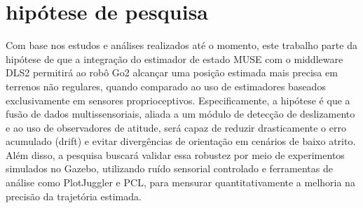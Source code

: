 \chapter{hipótese de pesquisa}
Com base nos estudos e análises realizados até o momento, este trabalho parte 
da hipótese de que a integração do estimador de estado MUSE com o middleware 
DLS2 permitirá ao robô Go2 alcançar uma posição estimada mais precisa em terrenos 
não regulares, quando comparado ao uso de estimadores baseados exclusivamente em 
sensores proprioceptivos. Especificamente, a hipótese é que a fusão de dados 
multissensoriais, aliada a um módulo de detecção de deslizamento  e ao uso de 
observadores de atitude, será capaz de reduzir drasticamente o erro acumulado 
(drift) e evitar divergências de orientação em cenários de baixo atrito. 
Além disso, a pesquisa buscará validar essa robustez por meio de experimentos 
simulados no Gazebo, utilizando ruído sensorial controlado e ferramentas de 
análise como PlotJuggler e PCL, para mensurar quantitativamente a melhoria na 
precisão da trajetória estimada.
